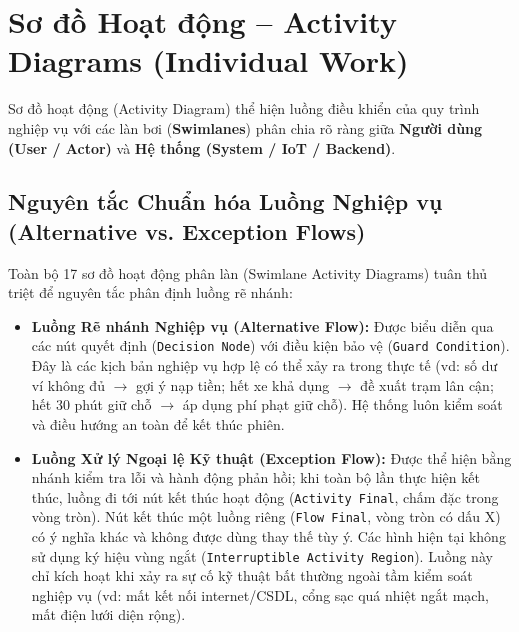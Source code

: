 \documentclass[12pt,a4paper]{article}
\begin{document}
\section{Sơ đồ Hoạt động -- Activity Diagrams (Individual Work)}

Sơ đồ hoạt động (Activity Diagram) thể hiện luồng điều khiển của quy trình nghiệp vụ với các làn bơi (\textbf{Swimlanes}) phân chia rõ ràng giữa \textbf{Người dùng (User / Actor)} và \textbf{Hệ thống (System / IoT / Backend)}.

\subsection*{Nguyên tắc Chuẩn hóa Luồng Nghiệp vụ (Alternative vs. Exception Flows)}
Toàn bộ 17 sơ đồ hoạt động phân làn (Swimlane Activity Diagrams) tuân thủ triệt để nguyên tắc phân định luồng rẽ nhánh:
\begin{itemize}[nosep]
    \item \textbf{Luồng Rẽ nhánh Nghiệp vụ (Alternative Flow):} Được biểu diễn qua các nút quyết định (\texttt{Decision Node}) với điều kiện bảo vệ (\texttt{Guard Condition}). Đây là các kịch bản nghiệp vụ hợp lệ có thể xảy ra trong thực tế (vd: số dư ví không đủ $\rightarrow$ gợi ý nạp tiền; hết xe khả dụng $\rightarrow$ đề xuất trạm lân cận; hết 30 phút giữ chỗ $\rightarrow$ áp dụng phí phạt giữ chỗ). Hệ thống luôn kiểm soát và điều hướng an toàn để kết thúc phiên.
    \item \textbf{Luồng Xử lý Ngoại lệ Kỹ thuật (Exception Flow):} Được thể hiện bằng nhánh kiểm tra lỗi và hành động phản hồi; khi toàn bộ lần thực hiện kết thúc, luồng đi tới nút kết thúc hoạt động (\texttt{Activity Final}, chấm đặc trong vòng tròn). Nút kết thúc một luồng riêng (\texttt{Flow Final}, vòng tròn có dấu X) có ý nghĩa khác và không được dùng thay thế tùy ý. Các hình hiện tại không sử dụng ký hiệu vùng ngắt (\texttt{Interruptible Activity Region}). Luồng này chỉ kích hoạt khi xảy ra sự cố kỹ thuật bất thường ngoài tầm kiểm soát nghiệp vụ (vd: mất kết nối internet/CSDL, cổng sạc quá nhiệt ngắt mạch, mất điện lưới diện rộng).
\end{itemize}
\end{document}
